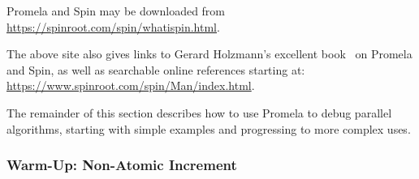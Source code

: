 Promela and Spin may be downloaded from
\url{https://spinroot.com/spin/whatispin.html}.

The above site also gives links to Gerard Holzmann's excellent
book~\cite{Holzmann03a} on Promela and Spin,
as well as searchable online references starting at:
\url{https://www.spinroot.com/spin/Man/index.html}.

The remainder of this section describes how to use Promela to debug
parallel algorithms, starting with simple examples and progressing to
more complex uses.

\subsubsection{Warm-Up: Non-Atomic Increment}
\label{sec:formal:Warm-Up: Non-Atomic Increment}

